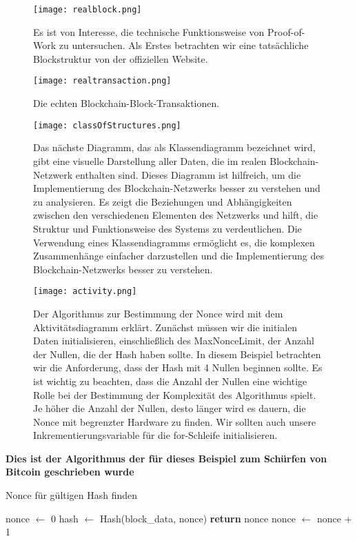 \documentclass[ngerman]{scrreprt}
\begin{document}
	\begin{figure}[H]
		\texttt{[image: realblock.png]}
		\caption{Es ist von Interesse, die technische Funktionsweise von Proof-of-Work zu untersuchen. Als Erstes betrachten wir eine tatsächliche Blockstruktur von der offiziellen Website.}
	\end{figure}
	\begin{figure}[H]
		\texttt{[image: realtransaction.png]}
		\caption{Die echten Blockchain-Block-Transaktionen.}

	\end{figure}
	\newpage
	\begin{figure}[H]
		\centering
		\texttt{[image: classOfStructures.png]}
		\caption{Das nächste Diagramm, das als Klassendiagramm bezeichnet wird, gibt eine visuelle Darstellung aller Daten, die im realen Blockchain-Netzwerk enthalten sind. Dieses Diagramm ist hilfreich, um die Implementierung des Blockchain-Netzwerks besser zu verstehen und zu analysieren. Es zeigt die Beziehungen und Abhängigkeiten zwischen den verschiedenen Elementen des Netzwerks und hilft, die Struktur und Funktionsweise des Systems zu verdeutlichen. Die Verwendung eines Klassendiagramms ermöglicht es, die komplexen Zusammenhänge einfacher darzustellen und die Implementierung des Blockchain-Netzwerks besser zu verstehen.}
	\end{figure}
	\newpage
	\begin{figure}[H]
		\centering
		\texttt{[image: activity.png]}
		\caption{Der Algorithmus zur Bestimmung der Nonce wird mit dem Aktivitätsdiagramm erklärt. Zunächst müssen wir die initialen Daten initialisieren, einschließlich des MaxNonceLimit, der Anzahl der Nullen, die der Hash haben sollte. In diesem Beispiel betrachten wir die Anforderung, dass der Hash mit 4 Nullen beginnen sollte. Es ist wichtig zu beachten, dass die Anzahl der Nullen eine wichtige Rolle bei der Bestimmung der Komplexität des Algorithmus spielt. Je höher die Anzahl der Nullen, desto länger wird es dauern, die Nonce mit begrenzter Hardware zu finden. Wir sollten auch unsere Inkrementierungsvariable für die for-Schleife initialisieren.}
	\end{figure}

\textbf{Dies ist der Algorithmus \textcommabelow der für dieses Beispiel zum Schürfen von Bitcoin geschrieben wurde} \\
\begin{algorithm}
	\caption{Nonce für gültigen Hash finden}
	\label{alg:nonce_find}
	
	\begin{algorithmic}[1]
		\State nonce $\gets$ 0
		\Repeat
		\State hash $\gets$ Hash(block\_data, nonce)
		\State \textbf{return} nonce
		\EndIf
		\State nonce $\gets$ nonce + 1
	\end{algorithmic}
\end{algorithm}
\end{document}
